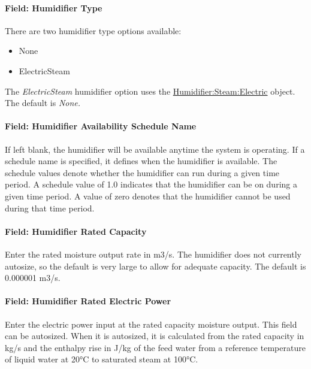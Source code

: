 \paragraph{Field: Humidifier Type}\label{field-humidifier-type-7}

There are two humidifier type options available:

\begin{itemize}
\item
  None
\item
  ElectricSteam
\end{itemize}

The \emph{ElectricSteam} humidifier option uses the \hyperref[humidifiersteamelectric]{Humidifier:Steam:Electric} object. The default is \emph{None.}

\paragraph{Field: Humidifier Availability Schedule Name}\label{field-humidifier-availability-schedule-name-7}

If left blank, the humidifier will be available anytime the system is operating. If a schedule name is specified, it defines when the humidifier is available. The schedule values denote whether the humidifier can run during a given time period. A schedule value of 1.0 indicates that the humidifier can be on during a given time period. A value of zero denotes that the humidifier cannot be used during that time period.

\paragraph{Field: Humidifier Rated Capacity}\label{field-humidifier-rated-capacity-7}

Enter the rated moisture output rate in m3/s. The humidifier does not currently autosize, so the default is very large to allow for adequate capacity. The default is 0.000001 m3/s.

\paragraph{Field: Humidifier Rated Electric Power}\label{field-humidifier-rated-electric-power-7}

Enter the electric power input at the rated capacity moisture output. This field can be autosized. When it is autosized, it is calculated from the rated capacity in kg/s and the enthalpy rise in J/kg of the feed water from a reference temperature of liquid water at 20°C to saturated steam at 100°C.

